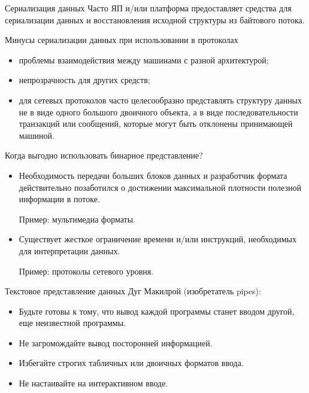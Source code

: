 \begin{frame}{Сериализация данных}
	Часто ЯП и/или платформа предоставляет средства для сериализации данных и восстановления исходной структуры из байтового потока.
\end{frame}

\begin{frame}{Минусы сериализации данных при использовании в протоколах}
	\begin{itemize}
		\item проблемы взаимодействия между машинами с разной архитектурой;
			\pause
		\item непрозрачность для других средств;
			\pause
		\item для сетевых протоколов часто целесообразно представлять структуру данных не в виде одного большого двоичного объекта,  а в виде последовательности транзакций или сообщений,  которые могут быть отклонены принимающей машиной.
	\end{itemize}
\end{frame}


\begin{frame}{Когда выгодно использовать бинарное представление?}
	\begin{itemize}
		\item Необходимость передачи больших блоков данных и разработчик формата действительно позаботился о достижении максимальной плотности полезной информации в потоке.

			Пример: мультимедиа форматы.
			\pause
		\item Существует жесткое ограничение времени и/или инструкций,  необходимых для интерпретации данных.

			Пример: протоколы сетевого уровня.
	\end{itemize}
\end{frame}

\begin{frame}{Текстовое представление данных}
	Дуг Макилрой (изобретатель pipes):
	\begin{itemize}
		\item Будьте готовы к тому,  что вывод каждой программы станет вводом другой,  еще неизвестной программы. 
			\pause
		\item Не загромождайте вывод посторонней информацией. 
			\pause
		\item Избегайте строгих табличных или двоичных форматов ввода. 
			\pause
		\item Не настаивайте на интерактивном вводе.
	\end{itemize}
\end{frame}

